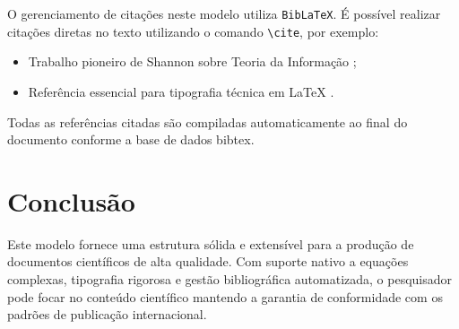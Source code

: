 \documentclass[11pt, a4paper]{article}
\theoremstyle{definition}
\theoremstyle{remark}
\begin{document}
O gerenciamento de citações neste modelo utiliza \texttt{BibLaTeX}. É possível realizar citações diretas no texto utilizando o comando \texttt{\textbackslash cite}, por exemplo:
\begin{itemize}
    \item Trabalho pioneiro de Shannon sobre Teoria da Informação \cite{shannon1948};
    \item Referência essencial para tipografia técnica em {\LaTeX} \cite{knuth1984}.
\end{itemize}

Todas as referências citadas são compiladas automaticamente ao final do documento conforme a base de dados bibtex.

\section{Conclusão}
\label{sec:conclusao}

Este modelo fornece uma estrutura sólida e extensível para a produção de documentos científicos de alta qualidade. Com suporte nativo a equações complexas, tipografia rigorosa e gestão bibliográfica automatizada, o pesquisador pode focar no conteúdo científico mantendo a garantia de conformidade com os padrões de publicação internacional.

\printbibliography[title={Referências Bibliográficas}]
\end{document}
